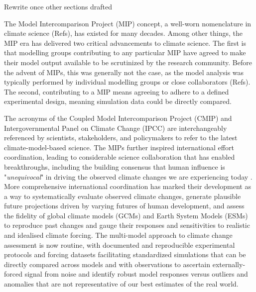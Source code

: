 \documentclass[gmd, preprint]{copernicus}
\def\cred#1{{\color{red}#1}}
\begin{document}


\introduction  %
\cred{Rewrite once other sections drafted}

The Model Intercomparison Project (MIP) concept, a well-worn nomenclature in climate science \cred{(Refs)}, has existed for many decades. Among other things, the MIP era has delivered two critical advancements to climate science. The first is that modelling groups contributing to any particular MIP have agreed to make their model output available to be scrutinized by the research community. Before the advent of MIPs, this was generally not the case, as the model analysis was typically performed by individual modelling groups or close collaborators \cred{(Refs)}. The second, contributing to a MIP means agreeing to adhere to a defined experimental design, meaning simulation data could be directly compared.

The acronyms of the Coupled Model Intercomparison Project (CMIP) and Intergovernmental Panel on Climate Change (IPCC) are interchangeably referenced by scientists, stakeholders, and policymakers to refer to the latest climate-model-based science. The MIPs further inspired international effort coordination, leading to considerable science collaboration that has enabled breakthroughs, including the building consensus that human influence is "\textit{unequivocal}" in driving the observed climate changes we are experiencing today \citep[see \autoref{fig:fig6-MIPImpact};][]{eyring_human_2021}. More comprehensive international coordination has marked their development as a way to systematically evaluate observed climate changes, generate plausible future projections driven by varying futures of human development, and assess the fidelity of global climate models (GCMs) and Earth System Models (ESMs) to reproduce past changes and gauge their responses and sensitivities to realistic and idealised climate forcing. The multi-model approach to climate change assessment is now routine, with documented and reproducible experimental protocols and forcing datasets facilitating standardized simulations that can be directly compared across models and with observations to ascertain externally-forced signal from noise and identify robust model responses versus outliers and anomalies that are not representative of our best estimates of the real world.
\end{document}
